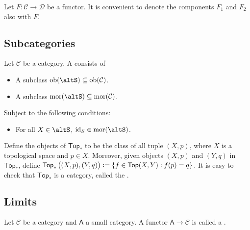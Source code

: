 \begin{remark}
	Let $F : \mathcal{C} \to \mathcal{D}$ be a functor. It is convenient to denote the components $F_1$ and $F_2$ also with $F$.
\end{remark}

\subsection*{Subcategories}
\begin{definition}[Subcategory]
	Let $\mathcal{C}$ be a category. A  consists of
	\begin{itemize}[leftmargin = *]
		\item A subclass $\ob(\mathcal{\altS}) \subseteq \ob(\mathcal{C})$.
		\item A subclass $\mor(\mathcal{\altS}) \subseteq \mor(\mathcal{C})$.
	\end{itemize}
	Subject to the following conditions:
	\begin{itemize}[leftmargin = *]
		\item For all $X \in \mathcal{\altS}$, $\id_S \in \mor(\mathcal{\altS})$.
	\end{itemize}
\end{definition}

\begin{example}
	Define the objects of $\mathsf{Top}_\ast$ to be the class of all tuple $(X,p)$, where $X$ is a topological space and $p \in X$. Moreover, given objects $(X,p)$ and $(Y,q)$ in $\mathsf{Top}_\ast$, define $\mathsf{Top}_\ast\del[1]{(X,p),(Y,q)} := \cbr[0]{f \in \mathsf{Top}(X,Y) : f(p) = q}$. It is easy to check that $\mathsf{Top}_\ast$ is a category, called the .

\end{example}

\subsection*{Limits}

\begin{definition}[Diagram]
	Let $\mathcal{C}$ be a category and $\mathsf{A}$ a small category. A functor $\mathsf{A} \to \mathcal{C}$ is called a .
\end{definition}

